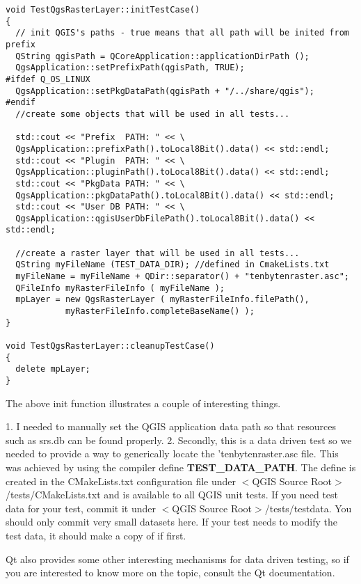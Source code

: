 \begin{verbatim}
void TestQgsRasterLayer::initTestCase()
{
  // init QGIS's paths - true means that all path will be inited from prefix
  QString qgisPath = QCoreApplication::applicationDirPath ();
  QgsApplication::setPrefixPath(qgisPath, TRUE);
#ifdef Q_OS_LINUX
  QgsApplication::setPkgDataPath(qgisPath + "/../share/qgis");
#endif
  //create some objects that will be used in all tests...

  std::cout << "Prefix  PATH: " << \
  QgsApplication::prefixPath().toLocal8Bit().data() << std::endl;
  std::cout << "Plugin  PATH: " << \
  QgsApplication::pluginPath().toLocal8Bit().data() << std::endl;
  std::cout << "PkgData PATH: " << \
  QgsApplication::pkgDataPath().toLocal8Bit().data() << std::endl;
  std::cout << "User DB PATH: " << \
  QgsApplication::qgisUserDbFilePath().toLocal8Bit().data() << std::endl;

  //create a raster layer that will be used in all tests...
  QString myFileName (TEST_DATA_DIR); //defined in CmakeLists.txt
  myFileName = myFileName + QDir::separator() + "tenbytenraster.asc";
  QFileInfo myRasterFileInfo ( myFileName );
  mpLayer = new QgsRasterLayer ( myRasterFileInfo.filePath(),
            myRasterFileInfo.completeBaseName() );
}

void TestQgsRasterLayer::cleanupTestCase()
{
  delete mpLayer;
}

\end{verbatim}

The above init function illustrates a couple of interesting things.

 1. I needed to manually set the QGIS application data path so that
   resources such as srs.db can be found properly.
 2. Secondly, this is a data driven test so we needed to provide a 
   way to generically locate the 'tenbytenraster.asc file. This was 
   achieved by using the compiler define \textbf{TEST\_DATA\_PATH}. The 
   define is created in the CMakeLists.txt configuration file under 
   $<$QGIS Source Root$>$/tests/CMakeLists.txt and is available to all 
   QGIS unit tests. If you need test data for your test, commit it 
   under $<$QGIS Source Root$>$/tests/testdata. You should only commit 
   very small datasets here. If your test needs to modify the test 
   data, it should make a copy of if first.

Qt also provides some other interesting mechanisms for data driven 
testing, so if you are interested to know more on the topic, consult 
the Qt documentation.

